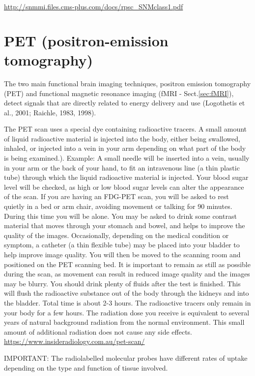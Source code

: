 \url{http://snmmi.files.cms-plus.com/docs/rpsc_SNMclass1.pdf}

\section{PET (positron-emission tomography)}
\label{sec:PET}


The two main functional brain imaging techniques, positron emission tomography
(PET) and functional magnetic resonance imaging (fMRI - Sect.\ref{sec:fMRI}),
detect signals that are directly related to energy delivery and use (Logothetis
et al., 2001; Raichle, 1983, 1998).


The PET scan uses a special dye containing radioactive tracers.
A small amount of liquid radioactive material is injected into the body, either
being swallowed, inhaled, or injected into a vein in your arm depending on what
part of the body is being examined.). Example:
A small needle will be inserted into a vein, usually in your arm or the back of
your hand, to fit an intravenous line (a thin plastic tube) through which the
liquid radioactive material is injected. Your blood sugar level will be checked,
as high or low blood sugar levels can alter the appearance of the scan.
If you are having an FDG-PET scan, you will be asked to rest quietly in a bed or
arm chair, avoiding movement or talking for 90 minutes. During this time you
will be alone. You may be asked to drink some contrast material that moves
through your stomach and bowel, and helps to improve the quality of the images.
Occasionally, depending on the medical condition or symptom, a catheter (a thin
flexible tube) may be placed into your bladder to help improve image quality.
You will then be moved to the scanning room and positioned on the PET scanning
bed. It is important to remain as still as possible during the scan, as movement
can result in reduced image quality and the images may be blurry.
You should drink plenty of fluids after the test is finished. This will flush
the radioactive substance out of the body through the kidneys and into the
bladder. Total time is about 2-3 hours.
The radioactive tracers only remain in your body for a few hours. The radiation
dose you receive is equivalent to several years of natural background radiation
from the normal environment. This small amount of additional radiation does not
cause any side effects.
\url{https://www.insideradiology.com.au/pet-scan/}


IMPORTANT: The radiolabelled molecular probes  have different rates of
uptake depending on the type and function of tissue involved.

